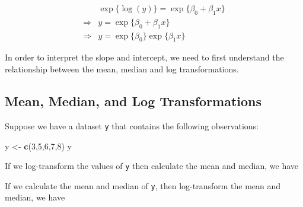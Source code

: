 \documentclass[]{book}
\newenvironment{Shaded}{\begin{snugshade}}{\end{snugshade}}
\newcommand{\KeywordTok}[1]{\textcolor[rgb]{0.13,0.29,0.53}{\textbf{#1}}}
\newcommand{\DataTypeTok}[1]{\textcolor[rgb]{0.13,0.29,0.53}{#1}}
\newcommand{\DecValTok}[1]{\textcolor[rgb]{0.00,0.00,0.81}{#1}}
\newcommand{\StringTok}[1]{\textcolor[rgb]{0.31,0.60,0.02}{#1}}
\newcommand{\OperatorTok}[1]{\textcolor[rgb]{0.81,0.36,0.00}{\textbf{#1}}}
\newcommand{\NormalTok}[1]{#1}
\begin{document}
\begin{equation}
\label{exp-y}
\begin{aligned}
&\exp\{\log(y)\} = \exp\{\beta_0 + \beta_1 x\} \\[10pt]
\Rightarrow &y = \exp\{\beta_0 + \beta_1 x\} \\[10pt]
\Rightarrow &y = \exp\{\beta_0\}\exp\{\beta_1 x\}
\end{aligned}
\end{equation}

In order to interpret the slope and intercept, we need to first
understand the relationship between the mean, median and log
transformations.

\subsection{Mean, Median, and Log
Transformations}\label{mean-median-and-log-transformations}

Suppose we have a dataset \texttt{y} that contains the following
observations:

\begin{Shaded}
\begin{Highlighting}[]
\NormalTok{y <-}\StringTok{ }\KeywordTok{c}\NormalTok{(}\DecValTok{3}\NormalTok{,}\DecValTok{5}\NormalTok{,}\DecValTok{6}\NormalTok{,}\DecValTok{7}\NormalTok{,}\DecValTok{8}\NormalTok{)}
\NormalTok{y}
\end{Highlighting}
\end{Shaded}

If we log-transform the values of \texttt{y} then calculate the mean and
median, we have

\begin{Shaded}
\end{Shaded}

If we calculate the mean and median of \texttt{y}, then log-transform
the mean and median, we have
\end{document}

